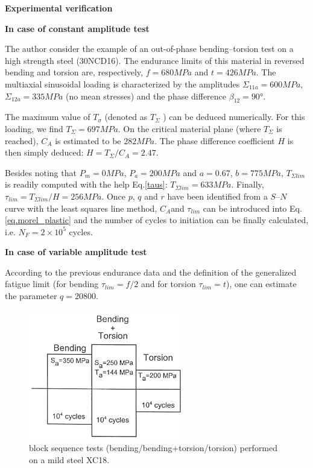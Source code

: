 \textbf{Experimental verification}
\vspace{6pt}

\textbf{In case of constant amplitude test }

The author \cite{FFE:FFE452} consider the example of an out-of-phase bending–torsion test on a high strength steel (30NCD16). The endurance limits of this material in reversed
bending and torsion are, respectively, $f=680 MPa$ and $t=426 MPa$.  The multiaxial sinusoidal loading is characterized by the amplitudes $\Sigma_{11a} =600 MPa$, $\Sigma_{12a} =335 MPa$ (no mean stresses)
and the phase difference $\beta_{12} =90°$.

The maximum value of $T_\sigma$ (denoted as $T_\Sigma$ ) can be deduced numerically. For this loading, we find $T_\Sigma=697 MPa$. On the critical material
plane (where $T_\Sigma$ is reached), $C_A$ is estimated to be $282 MPa$. The phase difference coefficient $H$ is
then simply deduced: $H=T_\Sigma /C_A =2.47$.

Besides noting that $P_m =0 MPa$, $P_a=200 MPa$ and $a=0.67$, $b=775 MPa$, $T_{\Sigma lim}$ is readily
computed with the help Eq.\eqref{taus}: $T_{\Sigma lim} =633 MPa$. Finally, $\tau_{lim} =T_{\Sigma lim} /H=256 MPa$. Once $p$, $q$ and $r$ have been identified from a $S–N$ curve with the least squares line method, $C_A $and $\tau_{lim}$ can
be introduced into Eq. \eqref{eq.morel_plastic} and the number of cycles to initiation can be finally calculated, i.e.
$N_F =2\times10^5$ cycles.

\textbf{In case of variable amplitude test }

According to the previous endurance data and the
definition of the generalized fatigue limit (for bending
$\tau_{lim} =f/2$ and for torsion $\tau_{lim}=t$), one can estimate the parameter $q=20 800$.

\begin{figure}[h!]
	\centering
	\includegraphics[width=0.6\textwidth]{figures//block.png} 
	\caption{block sequence tests (bending/bending+torsion/torsion) performed on a mild
		steel XC18.}
	\label{block}
\end{figure} 

